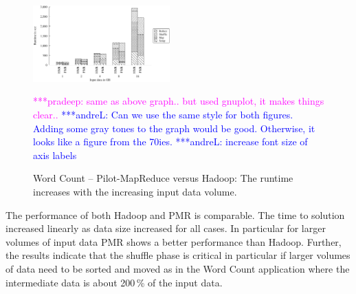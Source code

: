 \documentclass{acm_proc_article-sp}
\newcommand{\alnote}[1]{ {\textcolor{blue} { ***andreL: #1 }}}
\newcommand{\pnote}[1]{ {\textcolor{magenta} { ***pradeep: #1 }}}
\newcommand{\alnote}[1]{}
\newcommand{\pnote}[1]{}
\begin{document}
\begin{figure}[ht]
	\centering
		\includegraphics[width=0.47\textwidth]{figures/wordcount_hmr_pmr.pdf}
		\caption{Word Count -- Pilot-MapReduce versus Hadoop: The runtime increases with the increasing input data volume.} 
		\pnote{same as above graph.. but used gnuplot, it makes things clear..} \alnote{Can we use the same style for both figures. Adding some gray tones to the graph would be good. Otherwise, it looks like a figure from the 70ies.}
		\alnote{increase font size of axis labels}
	\label{fig:figures_compPMRvsHMR_gnuplot}
\end{figure}		
	
The performance of both Hadoop and PMR is comparable. The time to solution 
increased linearly as data size increased for all cases. In particular for 
larger volumes of input data PMR shows a better performance than Hadoop. 
Further, the results indicate that the shuffle phase is critical in particular 
if larger volumes of data need to be sorted and moved as in the Word Count 
application where the intermediate data is about 200\,\% of the input data.


\end{document}
